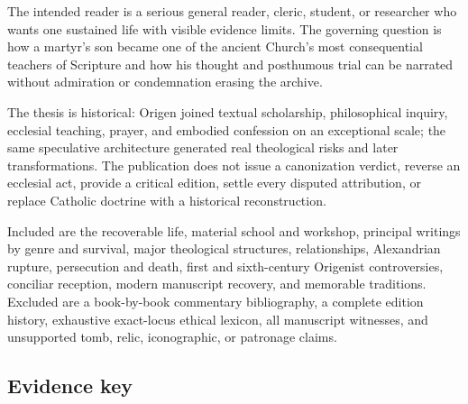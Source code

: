 The intended reader is a serious general reader, cleric, student, or researcher
who wants one sustained life with visible evidence limits. The governing
question is how a martyr's son became one of the ancient Church's most
consequential teachers of Scripture and how his thought and posthumous trial can be narrated
without admiration or condemnation erasing the archive.

The thesis is historical: Origen joined textual scholarship, philosophical
inquiry, ecclesial teaching, prayer, and embodied confession on an exceptional
scale; the same speculative architecture generated real theological risks and
later transformations. The publication does not issue a canonization verdict,
reverse an ecclesial act, provide a critical edition, settle every disputed
attribution, or replace Catholic doctrine with a historical reconstruction.

Included are the recoverable life, material school and workshop, principal
writings by genre and survival, major theological structures, relationships,
Alexandrian rupture, persecution and death, first and sixth-century Origenist
controversies, conciliar reception, modern manuscript recovery, and memorable
traditions. Excluded are a book-by-book commentary bibliography, a complete
edition history, exhaustive exact-locus ethical lexicon, all manuscript
witnesses, and unsupported tomb, relic, iconographic, or patronage claims.

\subsection{Evidence key}

\begin{evidencelegend}
\end{evidencelegend}

